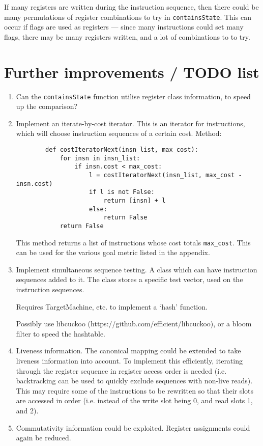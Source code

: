 \documentclass{article}
\begin{document}
If many registers are written during the instruction sequence, then there could be many permutations of register combinations to try in \texttt{containsState}. This can occur if flags are used as registers --- since many instructions could set many flags, there may be many registers written, and a lot of combinations to to try.


\section{Further improvements / TODO list}

\begin{enumerate}
    \item Can the \texttt{containsState} function utilise register class information, to speed up the comparison?
    \item Implement an iterate-by-cost iterator. This is an iterator for instructions, which will choose instruction sequences of a certain cost. Method:
        \begin{verbatim}
        def costIteratorNext(insn_list, max_cost):
            for insn in insn_list:
                if insn.cost < max_cost:
                    l = costIteratorNext(insn_list, max_cost - insn.cost)
                    if l is not False:
                        return [insn] + l
                    else:
                        return False
            return False
        \end{verbatim}

    This method returns a list of instructions whose cost totals \texttt{max\_cost}. This can be used for the various goal metric listed in the appendix.

    \item Implement simultaneous sequence testing. A class which can have instruction sequences added to it. The class stores a specific test vector, used on the instruction sequences.

    Requires TargetMachine, etc. to implement a `hash' function.

    Possibly use libcuckoo (https://github.com/efficient/libcuckoo), or a bloom filter to speed the hashtable.

    \item Liveness information. The canonical mapping could be extended to take liveness information into account. To implement this efficiently, iterating through the register sequence in register access order is needed (i.e. backtracking can be used to quickly exclude sequences with non-live reads). This may require some of the instructions to be rewritten so that their slots are accessed in order (i.e. instead of the write slot being 0, and read slots 1, and 2).
    \item Commutativity information could be exploited. Register assignments could again be reduced.
\end{enumerate}
\end{document}
